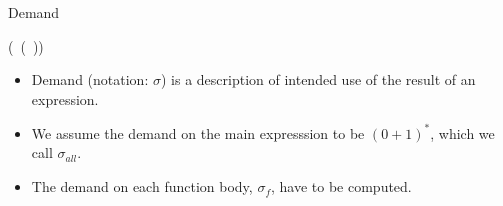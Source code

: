 \documentclass[xcolor=x11names,compress,mathserif]{beamer}
\renewcommand{\(}{\begin{columns}}
\renewcommand{\)}{\end{columns}}
\newcommand{\<}[1]{\begin{column}{#1}}
\renewcommand{\>}{\end{column}}
\begin{document}
\begin{frame}{Demand}
  \begin{center}
     (\CAR\ (\CDR\ \pw)) \\
  \end{center}
  \pause
\centerline{}
  \begin{itemize}
  \item Demand  (notation: $\sigma$) is a description  of intended use
    of the result of an expression.
   \pause
\item We assume the demand on the main expresssion to be $(0+1)^*$,
  which we call $\sigma_{all}$.
\item The demand on each function body, $\sigma_f$, have to be computed.
  \end{itemize}




\end{frame}
\end{document}
